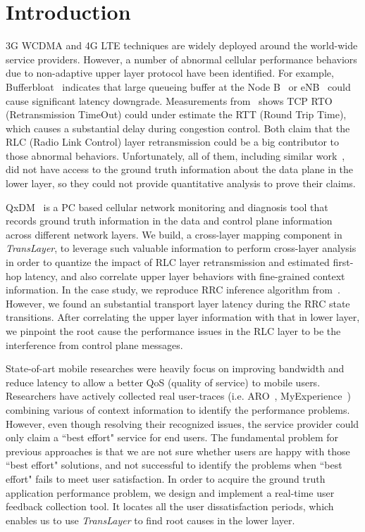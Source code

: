 \section{Introduction}

3G WCDMA and 4G LTE techniques are widely deployed around the world-wide service providers. However, a number of abnormal cellular performance behaviors due to non-adaptive upper layer protocol have been identified. For example, Bufferbloat~\cite{bufferbloat} indicates that large queueing buffer at the Node B~\cite{3gpp.3G} or eNB~\cite{3gpp.LTE} could cause significant latency downgrade. Measurements from~\cite{in-depth} shows TCP RTO (Retransmission TimeOut) could under estimate the RTT (Round Trip Time), which causes a substantial delay during congestion control. Both claim that the RLC (Radio Link Control) layer retransmission could be a big contributor to those abnormal behaviors. Unfortunately, all of them, including similar work~\cite{3g_rrc,aro}, did not have access to the ground truth information about the data plane in the lower layer, so they could not provide quantitative analysis to prove their claims. 

QxDM~\cite{qxdm_flyer} is a PC based cellular network monitoring and diagnosis tool that records ground truth information in the data and control plane information across different network layers. We build, a cross-layer mapping component in \textit{TransLayer}, to leverage such valuable information to perform cross-layer analysis in order to quantize the impact of RLC layer retransmission and estimated first-hop latency, and also correlate upper layer behaviors with fine-grained context information. In the case study, we reproduce RRC inference algorithm from~\cite{3g_rrc}. However, we found an substantial transport layer latency during the RRC state transitions. After correlating the upper layer information with that in lower layer, we pinpoint the root cause the performance issues in the RLC layer to be the interference from control plane messages.

State-of-art mobile researches were heavily focus on improving bandwidth and reduce latency to allow a better QoS (quality of service) to mobile users. Researchers have actively collected real user-traces (i.e. ARO~\cite{aro}, MyExperience~\cite{myexperience}) combining various of context information to identify the performance problems. However, even though resolving their recognized issues, the service provider could only claim a ``best effort" service for end users. The fundamental problem for previous approaches is that we are not sure whether users are happy with those ``best effort" solutions, and not successful to identify the problems when ``best effort" fails to meet user satisfaction. In order to acquire the ground truth application performance problem, we design and implement a real-time user feedback collection tool. It locates all the user dissatisfaction periods, which enables us to use \textit{TransLayer} to find root causes in the lower layer.

